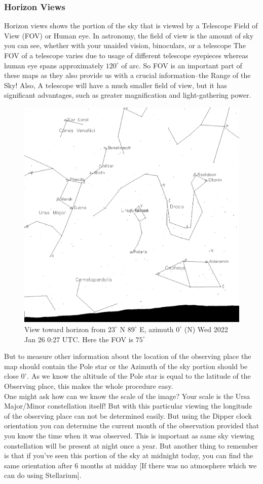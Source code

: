 \documentclass[a4paper,12pt]{extarticle}
\begin{document}
\subsubsection{Horizon Views}

Horizon views shows the portion of the sky that is viewed by a Telescope Field of View (FOV) or Human eye. In astronomy, the field of view is the amount of sky you can see, whether with your unaided vision, binoculars, or a telescope The FOV of a telescope varies due to usage of different telescope eyepieces whereas human eye spans approximately $120^\circ$ of arc. So FOV is an important part of these maps as they also provide us with a crucial information--the Range of the Sky! Also, A telescope will have a much smaller field of view, but it has significant advantages, such as greater magnification and light-gathering power. 
\begin{figure}[H]
    \centering
    \includegraphics[width=0.6\linewidth]{Hor_1.png}
    \caption{View toward horizon from $23^\circ$ N $89^\circ$ E, azimuth $0^\circ$ (N) Wed 2022 Jan 26 0:27 UTC. Here the FOV is $75^\circ$}
\end{figure}

But to measure other information about the location of the observing place the map should contain the Pole star or the Azimuth of the sky portion should be close $0^\circ$. As we know the altitude of the Pole star is equal to the latitude of the Observing place, this makes the whole procedure easy. \\

One might ask how can we know the scale of the image? Your scale is the Ursa Major/Minor constellation itself! But with this particular viewing the longitude of the observing place can not be determined easily. But using the Dipper clock orientation you can determine the current month of the observation provided that you know the time when it was observed. This is important as same sky viewing constellation will be present at night once a year. But another thing to remember is that if you've seen this portion of the sky at midnight today, you can find the same orientation after 6 months at midday [If there was no atmosphere which we can do using Stellarium].\\
\end{document}
